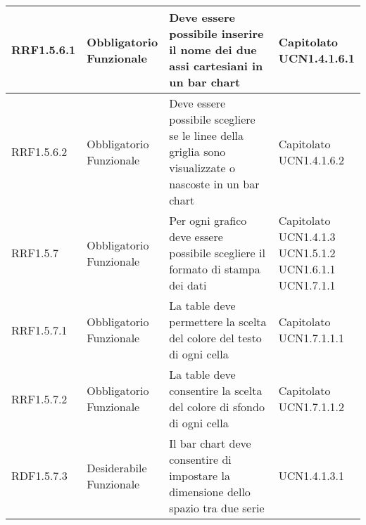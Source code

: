 \begin{longtabu}[c]{|X[0.7,l]|X[l]|X[2.5,l]|X[l]|}
                RRF1.5.6.1 & 
                \parbox[t]{4cm}{ Obbligatorio \\ Funzionale} & Deve essere possibile inserire il nome dei due assi cartesiani in un bar chart & \parbox[t]{4cm}{Capitolato \\ UCN1.4.1.6.1 }  \\ 
                \hline
                
                RRF1.5.6.2 & 
                \parbox[t]{4cm}{ Obbligatorio \\ Funzionale} & Deve essere possibile scegliere se le linee della griglia sono visualizzate o nascoste in un bar chart & \parbox[t]{4cm}{Capitolato \\ UCN1.4.1.6.2 }  \\ 
                \hline
                
                RRF1.5.7 & 
                \parbox[t]{4cm}{ Obbligatorio \\ Funzionale} & Per ogni grafico deve essere possibile scegliere il formato di stampa dei dati & \parbox[t]{4cm}{Capitolato \\ UCN1.4.1.3 \\ UCN1.5.1.2 \\ UCN1.6.1.1 \\ UCN1.7.1.1 }  \\ 
                \hline
                
                RRF1.5.7.1 & 
                \parbox[t]{4cm}{ Obbligatorio \\ Funzionale} & La table deve permettere la scelta del colore del testo di ogni cella & \parbox[t]{4cm}{Capitolato \\ UCN1.7.1.1.1 }  \\ 
                \hline
                
                RRF1.5.7.2 & 
                \parbox[t]{4cm}{ Obbligatorio \\ Funzionale} & La table deve consentire la scelta del colore di sfondo di ogni cella & \parbox[t]{4cm}{Capitolato \\ UCN1.7.1.1.2 }  \\ 
                \hline
                
                RDF1.5.7.3 & 
                \parbox[t]{4cm}{ Desiderabile \\ Funzionale} & Il bar chart deve consentire di impostare la dimensione dello spazio tra due serie & \parbox[t]{4cm}{UCN1.4.1.3.1 }  \\ 
                \hline
                

\end{longtabu}
